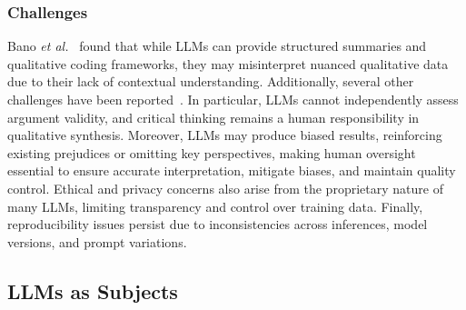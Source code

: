 \subsubsection{Challenges}

Bano \textit{et al.}~\cite{bano2023exploringqualitativeresearchusing} found that while LLMs can provide structured summaries and qualitative coding frameworks, they may misinterpret nuanced qualitative data due to their lack of contextual understanding. Additionally, several other challenges have been reported~\cite{DBLP:journals/ase/BanoHZT24, barros2024largelanguagemodelqualitative, leça2024applicationsimplicationslargelanguage}. In particular, LLMs cannot independently assess argument validity, and critical thinking remains a human responsibility in qualitative synthesis. Moreover, LLMs may produce biased results, reinforcing existing prejudices or omitting key perspectives, making human oversight essential to ensure accurate interpretation, mitigate biases, and maintain quality control. Ethical and privacy concerns also arise from the proprietary nature of many LLMs, limiting transparency and control over training data. Finally, reproducibility issues persist due to inconsistencies across inferences, model versions, and prompt variations.


\subsection{LLMs as Subjects}

